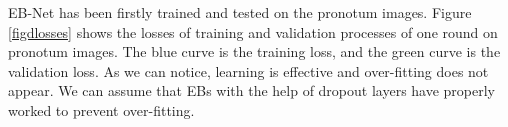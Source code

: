 \documentclass[review]{elsarticle}
\begin{document}



EB-Net has been firstly trained and tested on the pronotum images. Figure \ref{figdlosses} shows the losses of training and validation processes of one round on pronotum images. The blue curve is the training loss, and the green curve is the validation loss. As we can notice, learning is effective and over-fitting does not appear. We can assume that EBs with the help of dropout layers have properly worked to prevent over-fitting.
\end{document}
